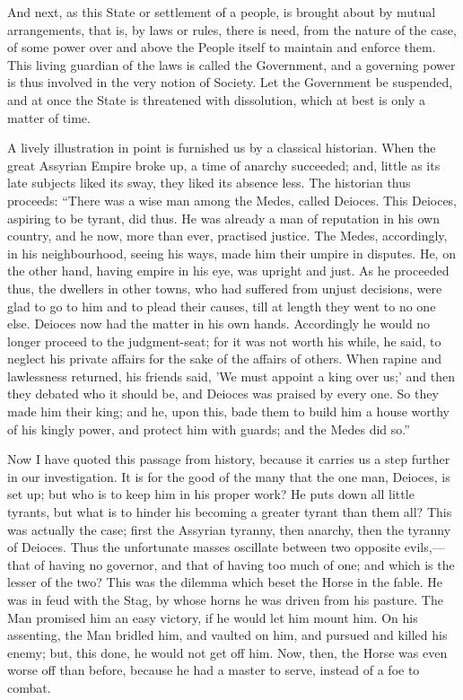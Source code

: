 And next, as this State or settlement of a
people, is brought about by mutual arrangements, that is, by laws or
rules, there is need, from the nature of the case, of some power over
and above the People itself to maintain and enforce them. This living
guardian of the laws is called the Government, and a governing
power is thus involved in the very notion of Society. Let the
Government be suspended, and at once the State is threatened with
dissolution, which at best is only a matter of time.

A lively illustration in point is furnished us by
a classical historian. When the great Assyrian Empire broke up, a time
of anarchy succeeded; and, little as its late subjects liked its sway,
they liked its absence less. The historian thus proceeds: ``There was a
wise man among the Medes, called Deioces. This Deioces, aspiring to be
tyrant, did thus. He was already a man of reputation in his own
country, and he now, more than ever, practised justice. The Medes,
accordingly, in his neighbourhood, seeing his ways, made him their
umpire in disputes. He, on the other hand, having empire in his eye,
was upright and just. As he proceeded thus, the dwellers in other
towns, who had suffered from unjust decisions, were glad to go to him
and to plead their causes, till at length they went to no one else.
Deioces now had the matter in his own hands. Accordingly he would no
longer proceed to the judgment-seat; for it was not worth his while,
he said, to neglect his private affairs for the sake of the affairs of
others. When rapine and lawlessness returned, his friends said, 'We
must appoint a king over us;' and then they debated who it should be,
and Deioces was praised by every one. So they made him their king; and
he, upon this, bade them to build him a house worthy of his kingly
power, and protect him with guards; and the Medes did so.''

Now I have quoted this passage from history,
because it carries us a step further in our investigation. It is for
the good of the many that the one man, Deioces, is set up; but who is
to keep him in his proper work? He puts down all little tyrants, but
what is to hinder his becoming a greater tyrant than them all?
This was actually the case; first the Assyrian tyranny, then anarchy,
then the tyranny of Deioces. Thus the unfortunate masses oscillate
between two opposite evils,—that of having no governor, and that of
having too much of one; and which is the lesser of the two? This was
the dilemma which beset the Horse in the fable. He was in feud with
the Stag, by whose horns he was driven from his pasture. The Man
promised him an easy victory, if he would let him mount him. On his
assenting, the Man bridled him, and vaulted on him, and pursued and
killed his enemy; but, this done, he would not get off him. Now, then,
the Horse was even worse off than before, because he had a master to
serve, instead of a foe to combat.

